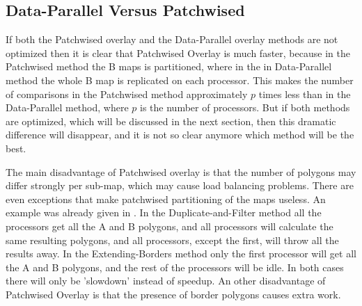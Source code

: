 \subsection{Data-Parallel Versus Patchwised}

If both the Patchwised overlay and the Data-Parallel overlay methods are
not optimized then it is clear that Patchwised Overlay is much faster,
because in the Patchwised method the B maps is partitioned, where in the
in Data-Parallel method the whole B map is replicated on each
processor.
This makes the number of comparisons in the Patchwised method
approximately $p$ times less than in the Data-Parallel method,
where $p$ is the number of processors.
But if both methods are optimized, which will be discussed in the
next section, then this dramatic difference will disappear, and it
is not so clear anymore which method will be the best.

The main disadvantage of Patchwised overlay is that the number of polygons
may differ strongly per sub-map, which may cause load balancing problems.
There are even exceptions that make patchwised partitioning of the maps 
useless.
An example was already given in 
.
In the Duplicate-and-Filter method all the processors get all the A
and B polygons, and all processors will calculate the same resulting
polygons, and all processors, except the first, will throw all the
results away.
In the Extending-Borders method only the first processor will get all
the A and B polygons, and the rest of the processors will be idle.
In both cases there will only be 'slowdown' instead of speedup.
An other disadvantage of Patchwised Overlay is that the presence of
border polygons causes extra work.
